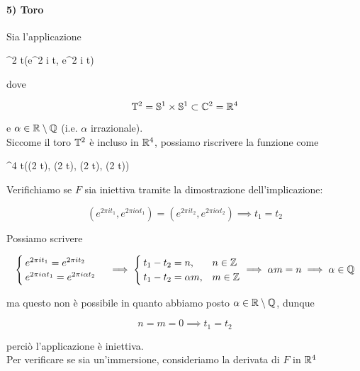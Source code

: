 \paragraph{5) Toro}

Sia l'applicazione

	{\R}{\T^{2}}
	{t}{(e^{2 \pi i t}, e^{2 \pi i \alpha t})}

dove

\begin{equation}
	\mathbb{T}^{2} = \mathbb{S}^{1} \times \mathbb{S}^{1} \subset \mathbb{C}^{2} = \mathbb{R}^{4}
\end{equation}

e $ \alpha \in \mathbb{R} \setminus \mathbb{Q} $ (i.e. $ \alpha $ irrazionale).\\
Siccome il toro $ \mathbb{T}^{2} $ è incluso in $ \mathbb{R}^{4} $, possiamo riscrivere la funzione come

	{\R}{\R^{4}}
	{t}{(\cos(2 \pi t), \sin(2 \pi t), \cos(2 \pi \alpha t), \sin(2 \pi \alpha t))}

Verifichiamo se $ F $ sia iniettiva tramite la dimostrazione dell'implicazione:

\begin{equation}
	(e^{2 \pi i t_{1}}, e^{2 \pi i \alpha t_{1}}) = (e^{2 \pi i t_{2}}, e^{2 \pi i \alpha t_{2}}) %
	\implies %
	t_{1} = t_{2}
\end{equation}

Possiamo scrivere

\begin{equation}
	\begin{cases}
		e^{2 \pi i t_{1}} = e^{2 \pi i t_{2}} \\
		e^{2 \pi i \alpha t_{1}} = e^{2 \pi i \alpha t_{2}}
	\end{cases} %
	\implies %
	\begin{cases}
		t_{1} - t_{2} = n, & n \in \Z \\
		t_{1} - t_{2} = \alpha m, & m \in \Z
	\end{cases} %
	\implies %
	\alpha m = n %
	\implies %
	\alpha \in \Q
\end{equation}

ma questo non è possibile in quanto abbiamo posto $ \alpha \in \mathbb{R} \setminus \mathbb{Q} $, dunque

\begin{equation}
	n = m = 0 \implies t_{1} = t_{2}
\end{equation}

perciò l'applicazione è iniettiva.\\
Per verificare se sia un'immersione, consideriamo la derivata di $ F $ in $ \mathbb{R}^{4} $

